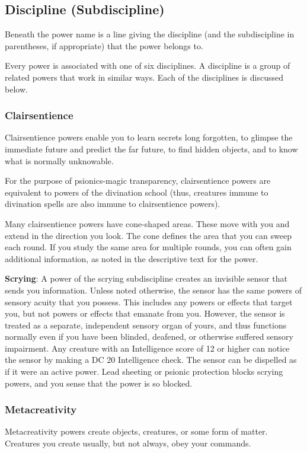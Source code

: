 \subsection{Discipline (Subdiscipline)}
Beneath the power name is a line giving the discipline (and the subdiscipline in parentheses, if appropriate) that the power belongs to.

Every power is associated with one of six disciplines. A discipline is a group of related powers that work in similar ways. Each of the disciplines is discussed below.

\subsubsection{Clairsentience}
Clairsentience powers enable you to learn secrets long forgotten, to glimpse the immediate future and predict the far future, to find hidden objects, and to know what is normally unknowable.

For the purpose of psionics-magic transparency, clairsentience powers are equivalent to powers of the divination school (thus, creatures immune to divination spells are also immune to clairsentience powers).

Many clairsentience powers have cone-shaped areas. These move with you and extend in the direction you look. The cone defines the area that you can sweep each round. If you study the same area for multiple rounds, you can often gain additional information, as noted in the descriptive text for the power.

\textbf{Scrying}: A power of the scrying subdiscipline creates an invisible sensor that sends you information. Unless noted otherwise, the sensor has the same powers of sensory acuity that you possess. This includes any powers or effects that target you, but not powers or effects that emanate from you. However, the sensor is treated as a separate, independent sensory organ of yours, and thus functions normally even if you have been blinded, deafened, or otherwise suffered sensory impairment. Any creature with an Intelligence score of 12 or higher can notice the sensor by making a DC 20 Intelligence check. The sensor can be dispelled as if it were an active power. Lead sheeting or psionic protection blocks scrying powers, and you sense that the power is so blocked.

\subsubsection{Metacreativity}
Metacreativity powers create objects, creatures, or some form of matter. Creatures you create usually, but not always, obey your commands.

